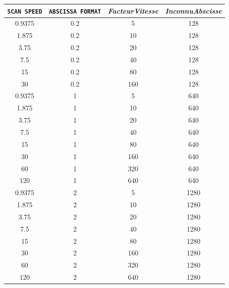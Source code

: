 \documentclass[a4paper, 12pt]{article}
\begin{document}
		\begin{longtable}[c]{|c|c|c|c|}

\hline
\verb|SCAN SPEED| & \verb|ABSCISSA FORMAT| & \emph{FacteurVitesse} & \emph{InconnuAbscisse} \\ \hline
\endhead
%
0.9375     & 0.2             & 5              & 128     \\ \hline
1.875      & 0.2             & 10             & 128     \\ \hline
3.75       & 0.2             & 20             & 128     \\ \hline
7.5        & 0.2             & 40             & 128     \\ \hline
15         & 0.2             & 80             & 128     \\ \hline
30         & 0.2             & 160            & 128     \\ \hline
0.9375     & 1               & 5              & 640     \\ \hline
1.875      & 1               & 10             & 640     \\ \hline
3.75       & 1               & 20             & 640     \\ \hline
7.5        & 1               & 40             & 640     \\ \hline
15         & 1               & 80             & 640     \\ \hline
30         & 1               & 160            & 640     \\ \hline
60         & 1               & 320            & 640     \\ \hline
120        & 1               & 640            & 640     \\ \hline
0.9375     & 2               & 5              & 1280    \\ \hline
1.875      & 2               & 10             & 1280    \\ \hline
3.75       & 2               & 20             & 1280    \\ \hline
7.5        & 2               & 40             & 1280    \\ \hline
15         & 2               & 80             & 1280    \\ \hline
30         & 2               & 160            & 1280    \\ \hline
60         & 2               & 320            & 1280    \\ \hline
120        & 2               & 640            & 1280    \\ \hline

\end{longtable}
\end{document}
